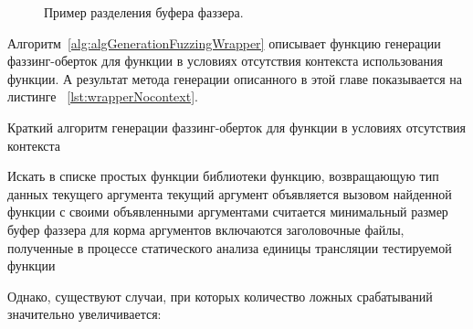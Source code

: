 \begin{figure}[ht]
    \caption{Пример разделения буфера фаззера.}\label{fig:sliceBuffer}
\end{figure}

Алгоритм~\cref{alg:algGenerationFuzzingWrapper} описывает функцию генерации фаззинг-оберток для функции в условиях отсутствия контекста использования функции. А результат метода генерации описанного в этой главе показывается на листинге ~\cref{lst:wrapperNocontext}. 

\begin{algorithm}
    \caption{Краткий алгоритм генерации фаззинг-оберток для функции в условиях отсутствия контекста}\label{alg:algGenerationFuzzingWrapper}
    \begin{algorithmic}[1]
                \Else
                    \Loop
                        \State Искать в списке простых функции библиотеки функцию, возвращающую тип данных текущего аргумента
                            \State текущий аргумент объявляется вызовом найденной функции с своими объявленными аргументами
                        \EndIf
                    \EndLoop
                \EndIf
            \EndFor
            \State считается минимальный размер буфер фаззера для корма аргументов
            \State включаются заголовочные файлы, полученные в процессе статического анализа единицы трансляции тестируемой функции
    \EndFunction
        \end{algorithmic}
\end{algorithm}

    Однако, существуют случаи, при которых количество ложных срабатываний значительно увеличивается:

